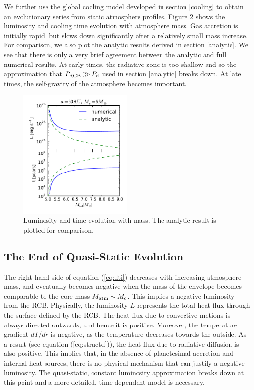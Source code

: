 \documentclass[apj]{emulateapj}
\begin{document}
We further use the global cooling model developed in section \ref{cooling} to obtain an evolutionary series from static atmosphere profiles. Figure 2 shows the luminosity and cooling time evolution with atmosphere mass. Gas accretion is initially rapid, but slows down significantly after a relatively small mass increase. For comparison, we also plot the analytic results derived in section \ref{analytic}. We see that there is only a very brief agreement between the analytic and full numerical results. At early times, the radiative zone is too shallow and so the approximation that $P_{\rm RCB} \gg P_{\rm d}$ used in section \ref{analytic} breaks down. At late times, the self-gravity of the atmosphere becomes important. %

\begin{figure}[h]
\centering
\includegraphics[width=0.5\textwidth]{../../figs/ModelAtmospheres/RadSelfGravPoly/PaperFigs/Lt_profiles_v2.pdf}
\caption{Luminosity and time evolution with mass. The analytic result is plotted for comparison.}
\label{fig:Ltplot}
\end{figure}

\subsection{The End of Quasi-Static Evolution}
\label{endoftime}


The right-hand side of equation (\ref{eq:dti}) decreases with increasing atmosphere mass, and eventually becomes negative when the mass of the envelope becomes comparable to the core mass $M_{\rm{atm}} \sim M_{\rm{c}}$. This implies a negative luminosity from the RCB. Physically, the luminosity $L$ represents the total heat flux through the surface defined by the RCB. The heat flux due to convective motions is always directed outwards, and hence it is positive. Moreover, the temperature gradient $dT/dr$ is negative, as the temperature decreases towards the outside. As a result (see equation (\ref{eq:structd})), the heat flux due to radiative diffusion is also positive. This implies that, in the absence of planetesimal accretion and internal heat sources, there is no physical mechanism that can justify a negative luminosity. The quasi-static, constant luminosity approximation breaks down at this point and a more detailed, time-dependent model is necessary.
\end{document}
